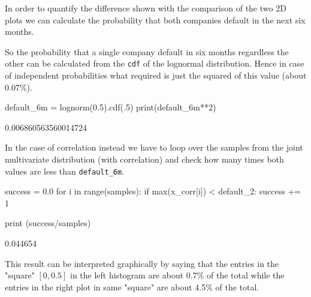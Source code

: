 In order to quantify the difference shown with the comparison of the two 2D plots we can calculate the probability that both companies default in the next six months.

So the probability that a single company default in six months regardless the other can be calculated from the \texttt{cdf} of the lognormal distribution.
Hence in case of independent probabilities what required is just the squared of this value (about 0.07\%).

\begin{ipython}
default_6m = lognorm(0.5).cdf(.5)
print(default_6m**2)

0.006860563560014724
\end{ipython}

In the case of correlation instead we have to loop over the samples from the joint multivariate distribution (with correlation) and check how many times both values are less than \texttt{default\_6m}.

\begin{ipython}
success = 0.0
for i in range(samples):
    if max(x_corr[i]) < default_2:
        success += 1

print (success/samples)

0.044654
\end{ipython}

This result can be interpreted graphically by saying that the entries in the "square" $[0, 0.5]$ in the left histogram are about 0.7\% of the total while the entries in the right plot in same "square" are about 4.5\% of the total. 
